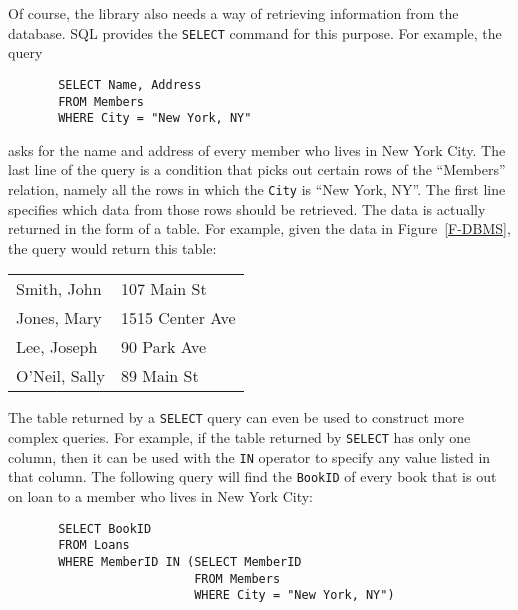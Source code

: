 Of course, the library also needs a way of retrieving
information from the database.  SQL provides the
\texttt{SELECT} command for this purpose.  For example,
the query
\begin{verbatim}
       SELECT Name, Address
       FROM Members
       WHERE City = "New York, NY"
\end{verbatim}
asks for the name and address of every member who lives in 
New York City.  The last line of the query is a condition
that picks out certain rows of the ``Members'' relation,
namely all the rows in which the \texttt{City} is
``New York, NY''.  The first line specifies which data
from those rows should be retrieved.  The data is actually
returned in the form of a table.  For example, given the
data in Figure~\ref{F-DBMS}, the query would return this
table:
\begin{center}
\begin{tabular}{|l|l|}
        \hline
        \strut Smith, John& 107 Main St\\
        Jones, Mary& 1515 Center Ave\\
        Lee, Joseph& 90 Park Ave\\
        O'Neil, Sally& 89 Main St\\
        \hline
\end{tabular}
\end{center}
The table returned by a \texttt{SELECT} query can even be used
to construct more complex queries.  For example, if the table returned 
by \texttt{SELECT} has only one column, then it can be
used with the \texttt{IN} operator to specify any value
listed in that column.  The following query will find the
\texttt{BookID} of every book that is out on loan to a
member who lives in New York City:
\begin{verbatim}
       SELECT BookID
       FROM Loans
       WHERE MemberID IN (SELECT MemberID
                          FROM Members
                          WHERE City = "New York, NY")
\end{verbatim}

